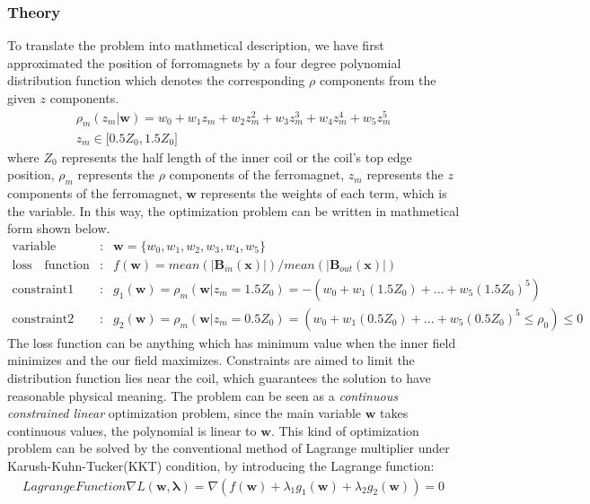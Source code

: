 \subsubsection{Theory}
To translate the problem into mathmetical description,
we have first approximated the position of forromagnets by a four degree polynomial distribution function which denotes the corresponding $\rho$ components from the given $z$ components.
\begin{eqnarray}
  \rho_m(z_m|\mathbf{w}) = w_0 + w_1z_m + w_2z_m^2 + w_3z_m^3 + w_4z_m^4 + w_5z_m^5\\
  z_m \in \mathrm{[}0.5Z_0, 1.5Z_0\mathrm{]}\nonumber
\end{eqnarray}
where $Z_0$ represents the half length of the inner coil or the coil's top edge position,
$\rho_m$ represents the $\rho$ components of the ferromagnet,
$z_m$ represents the $z$ components of the ferromagnet,
$\mathbf{w}$ represents the weights of each term, which is the variable.
In this way, the optimization problem can be written in mathmetical form shown below.
\begin{eqnarray}
  \mathrm{variable}&:& \mathbf{w} = \{w_0, w_1, w_2, w_3, w_4, w_5\}\\
  \mathrm{loss\quad function}&:& f(\mathbf{w}) = mean\left(|\mathbf{B}_{in}(\mathbf{x})|\right) / mean\left(|\mathbf{B}_{out}(\mathbf{x})|\right)\\\nonumber
  \mathrm{constraint1}&:& g_1(\mathbf{w}) = \rho_m(\mathbf{w}|z_m=1.5Z_0) = -\left(w_0 + w_1(1.5Z_0) + ... + w_5(1.5Z_0)^5\right)\\\nonumber
  \mathrm{constraint2}&:& g_2(\mathbf{w}) = \rho_m(\mathbf{w}|z_m=0.5Z_0) = \left(w_0 + w_1(0.5Z_0) + ... + w_5(0.5Z_0)^5 \le \rho_0 \right) \le0\nonumber
\end{eqnarray}
The loss function can be anything which has minimum value when the inner field minimizes and the our field maximizes.
Constraints are aimed to limit the distribution function lies near the coil,
which guarantees the solution to have reasonable physical meaning.
The problem can be seen as a {\sl continuous constrained linear} optimization problem,
since the main variable $\mathbf{w}$ takes continuous values,
the polynomial is linear to $\mathbf{w}$.
This kind of optimization problem can be solved by the conventional method of Lagrange multiplier under Karush-Kuhn-Tucker(KKT) condition,
by introducing the Lagrange function:
\begin{eqnarray}
  Lagrange Function \nabla L(\mathbf{w, \lambda}) = \nabla\left( f(\mathbf{w})+\lambda_1 g_1(\mathbf{w})+\lambda_2 g_2(\mathbf{w})\right)=0
\end{eqnarray}
